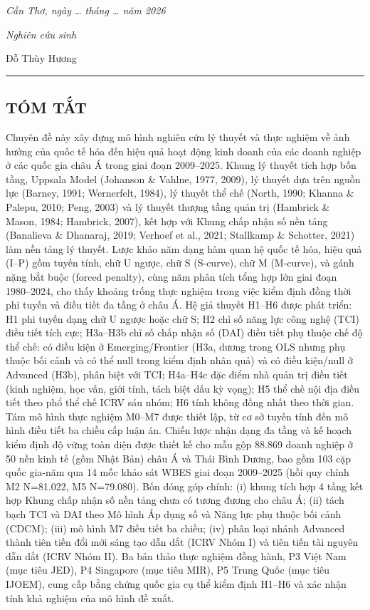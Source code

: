 \documentclass[
  a4paper,
  13pt]{extreport}
\begin{document}
\emph{Cần Thơ, ngày \ldots{} tháng \ldots{} năm 2026}

\emph{Nghiên cứu sinh}

Đỗ Thùy Hương

\begin{center}\rule{0.5\linewidth}{0.5pt}\end{center}

\hypertarget{tuxf3m-tux1eaft}{%
\subsection{TÓM TẮT}\label{tuxf3m-tux1eaft}}

Chuyên đề này xây dựng mô hình nghiên cứu lý thuyết và thực nghiệm về
ảnh hưởng của quốc tế hóa đến hiệu quả hoạt động kinh doanh của các
doanh nghiệp ở các quốc gia châu Á trong giai đoạn 2009--2025. Khung lý
thuyết tích hợp bốn tầng, Uppsala Model (Johanson \& Vahlne, 1977,
2009), lý thuyết dựa trên nguồn lực (Barney, 1991; Wernerfelt, 1984), lý
thuyết thể chế (North, 1990; Khanna \& Palepu, 2010; Peng, 2003) và lý
thuyết thượng tầng quản trị (Hambrick \& Mason, 1984; Hambrick, 2007),
kết hợp với Khung chấp nhận số nền tảng (Banalieva \& Dhanaraj, 2019;
Verhoef et al., 2021; Stallkamp \& Schotter, 2021) làm nền tảng lý
thuyết. Lược khảo năm dạng hàm quan hệ quốc tế hóa, hiệu quả (I--P) gồm
tuyến tính, chữ U ngược, chữ S (S-curve), chữ M (M-curve), và gánh nặng
bắt buộc (forced penalty), cùng năm phân tích tổng hợp lớn giai đoạn
1980--2024, cho thấy khoảng trống thực nghiệm trong việc kiểm định đồng
thời phi tuyến và điều tiết đa tầng ở châu Á. Hệ giả thuyết H1--H6 được
phát triển: H1 phi tuyến dạng chữ U ngược hoặc chữ S; H2 chỉ số năng lực
công nghệ (TCI) điều tiết tích cực; H3a--H3b chỉ số chấp nhận số (DAI)
điều tiết phụ thuộc chế độ thể chế: có điều kiện ở Emerging/Frontier
(H3a, dương trong OLS nhưng phụ thuộc bối cảnh và có thể null trong kiểm
định nhân quả) và có điều kiện/null ở Advanced (H3b), phân biệt với TCI;
H4a--H4c đặc điểm nhà quản trị điều tiết (kinh nghiệm, học vấn, giới
tính, tách biệt dấu kỳ vọng); H5 thể chế nội địa điều tiết theo phổ thể
chế ICRV sáu nhóm; H6 tính không đồng nhất theo thời gian. Tám mô hình
thực nghiệm M0--M7 được thiết lập, từ cơ sở tuyến tính đến mô hình điều
tiết ba chiều cấp luận án. Chiến lược nhận dạng đa tầng và kế hoạch kiểm
định độ vững toàn diện được thiết kế cho mẫu gộp 88.869 doanh nghiệp ở
50 nền kinh tế (gồm Nhật Bản) châu Á và Thái Bình Dương, bao gồm 103 cặp
quốc gia-năm qua 14 mốc khảo sát WBES giai đoạn 2009--2025 (hồi quy
chính M2 N=81.022, M5 N=79.080). Bốn đóng góp chính: (i) khung tích hợp
4 tầng kết hợp Khung chấp nhận số nền tảng chưa có tương đương cho châu
Á; (ii) tách bạch TCI và DAI theo Mô hình Áp dụng số và Năng lực phụ
thuộc bối cảnh (CDCM); (iii) mô hình M7 điều tiết ba chiều; (iv) phân
loại nhánh Advanced thành tiên tiến đổi mới sáng tạo dẫn dắt (ICRV Nhóm
I) và tiên tiến tài nguyên dẫn dắt (ICRV Nhóm II). Ba bản thảo thực
nghiệm đồng hành, P3 Việt Nam (mục tiêu JED), P4 Singapore (mục tiêu
MIR), P5 Trung Quốc (mục tiêu IJOEM), cung cấp bằng chứng quốc gia cụ
thể kiểm định H1--H6 và xác nhận tính khả nghiệm của mô hình đề xuất.
\end{document}
